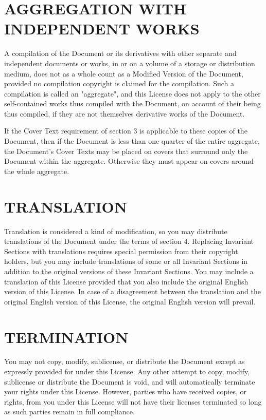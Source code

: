 \section{AGGREGATION WITH INDEPENDENT WORKS}\label{gfdl-7}

A compilation of the Document or its derivatives with other separate and
independent documents or works, in or on a volume of a storage or
distribution medium, does not as a whole count as a Modified Version of
the Document, provided no compilation copyright is claimed for the
compilation. Such a compilation is called an "aggregate", and this
License does not apply to the other self-contained works thus compiled
with the Document, on account of their being thus compiled, if they are
not themselves derivative works of the Document.

If the Cover Text requirement of section 3 is applicable to these copies
of the Document, then if the Document is less than one quarter of the
entire aggregate, the Document's Cover Texts may be placed on covers
that surround only the Document within the aggregate. Otherwise they
must appear on covers around the whole aggregate.

\section{TRANSLATION}\label{gfdl-8}

Translation is considered a kind of modification, so you may distribute
translations of the Document under the terms of section 4. Replacing
Invariant Sections with translations requires special permission from
their copyright holders, but you may include translations of some or all
Invariant Sections in addition to the original versions of these
Invariant Sections. You may include a translation of this License
provided that you also include the original English version of this
License. In case of a disagreement between the translation and the
original English version of this License, the original English version
will prevail.

\section{TERMINATION}\label{gfdl-9}

You may not copy, modify, sublicense, or distribute the Document except
as expressly provided for under this License. Any other attempt to copy,
modify, sublicense or distribute the Document is void, and will
automatically terminate your rights under this License. However, parties
who have received copies, or rights, from you under this License will
not have their licenses terminated so long as such parties remain in
full compliance.

